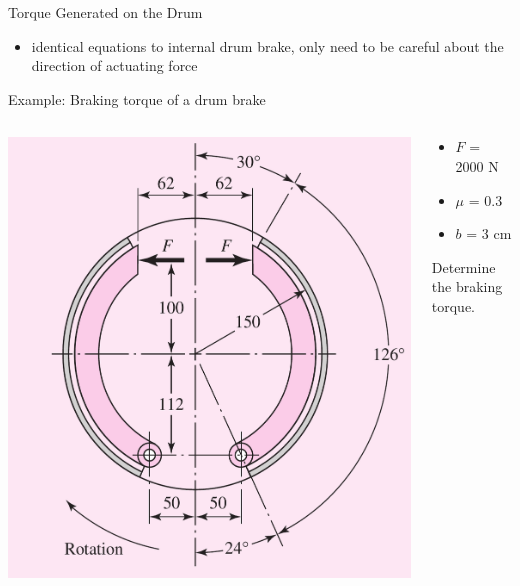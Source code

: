 \documentclass[10pt, svgnames]{beamer}
\begin{document}
\begin{frame}[label={sec:org5bc5b34}]{Torque Generated on the Drum}
\begin{itemize}
\item identical equations to internal drum brake, only need to be careful about the direction of actuating force
\end{itemize}
\end{frame}

\begin{frame}[label={sec:org4bef5d9}]{Example: Braking torque of a drum brake}
\begin{columns}
\begin{column}{0.7\columnwidth}
\begin{center}
\includegraphics[width=.9\linewidth]{./pictures/drum-example.png}
\end{center}
\end{column}

\begin{column}{0.7\columnwidth}
\begin{itemize}
\item \(F\) = 2000 N
\item \(\mu\) = 0.3
\item \(b\) = 3 cm
\end{itemize}

Determine the braking torque.
\end{column}
\end{columns}
\end{frame}
\end{document}
